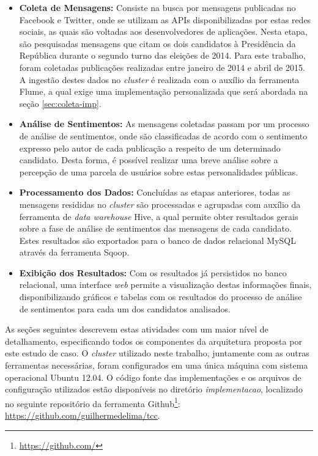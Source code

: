 \begin{itemize}

  \item \textbf{Coleta de Mensagens:} Consiste na busca por mensagens publicadas no Facebook e Twitter, onde se utilizam as APIs disponibilizadas por estas redes sociais, as quais são voltadas aos desenvolvedores de aplicações. Nesta etapa, são pesquisadas mensagens que citam os dois candidatos à Presidência da República durante o segundo turno das eleições de 2014. Para este trabalho, foram coletadas publicações realizadas entre janeiro de 2014 e abril de 2015. A ingestão destes dados no \textit{cluster} é realizada com o auxílio da ferramenta Flume, a qual exige uma implementação personalizada que será abordada na seção \ref{sec:coleta-imp}.
  \item \textbf{Análise de Sentimentos:} As mensagens coletadas passam por um processo de análise de sentimentos, onde são classificadas de acordo com o sentimento expresso pelo autor de cada publicação a respeito de um determinado candidato. Desta forma, é possível realizar uma breve análise sobre a percepção de uma parcela de usuários sobre estas personalidades públicas.
  \item \textbf{Processamento dos Dados:} Concluídas as etapas anteriores, todas as mensagens resididas no \textit{cluster} são processadas e agrupadas com auxílio da ferramenta de \textit{data warehouse} Hive, a qual permite obter resultados gerais sobre a fase de análise de sentimentos das mensagens de cada candidato. Estes resultados são exportados para o banco de dados relacional MySQL através da ferramenta Sqoop.
  \item \textbf{Exibição dos Resultados:} Com os resultados já persistidos no banco relacional, uma interface \textit{web} permite a visualização destas informações finais, disponibilizando gráficos e tabelas com os resultados do processo de análise de sentimentos para cada um dos candidatos analisados.

\end{itemize}

As seções seguintes descrevem estas atividades com um maior nível de detalhamento, especificando todos os componentes da arquitetura proposta por este estudo de caso. O \textit{cluster} utilizado neste trabalho, juntamente com as outras ferramentas necessárias, foram configurados em uma única máquina com sistema operacional Ubuntu 12.04. O código fonte das implementações e os arquivos de configuração utilizados estão disponíveis no diretório \textit{implementacao}, localizado no seguinte repositório da ferramenta Github\footnote{\url{https://github.com/}}: \url{https://github.com/guilhermedelima/tcc}.

